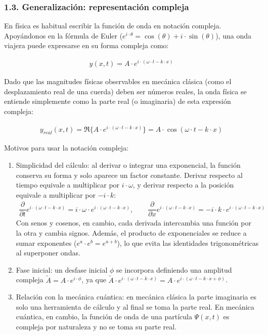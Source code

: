 \documentclass[
  spanish,
]{article}
\providecommand{\tightlist}{%
  \setlength{\itemsep}{0pt}\setlength{\parskip}{0pt}}
\begin{document}
\subsubsection{1.3. Generalización: representación
compleja}\label{generalizaciuxf3n-representaciuxf3n-compleja}

En física es habitual escribir la función de onda en notación compleja.
Apoyándonos en la fórmula de Euler
(\(e^{i \cdot \theta} = \cos(\theta) + i \cdot \sin(\theta)\)), una onda
viajera puede expresarse en su forma compleja como:

\[
\begin{aligned}
y(x,t) = A \cdot e^{i \cdot (\omega \cdot t - k \cdot x)}
\end{aligned}
\]

Dado que las magnitudes físicas observables en mecánica clásica (como el
desplazamiento real de una cuerda) deben ser números reales, la onda
física se entiende simplemente como la parte real (o imaginaria) de esta
expresión compleja:

\[
\begin{aligned}
y_{real}(x,t) = \Re\{A \cdot e^{i \cdot (\omega \cdot t - k \cdot x)}\} = A \cdot \cos(\omega \cdot t - k \cdot x)
\end{aligned}
\]

Motivos para usar la notación compleja:

\begin{enumerate}
\def\labelenumi{\arabic{enumi}.}
\tightlist
\item
  Simplicidad del cálculo: al derivar o integrar una exponencial, la
  función conserva su forma y solo aparece un factor constante. Derivar
  respecto al tiempo equivale a multiplicar por \(i \cdot \omega\), y
  derivar respecto a la posición equivale a multiplicar por
  \(-i \cdot k\): \[
  \begin{aligned}
  \dfrac{\partial}{\partial t} e^{i \cdot (\omega \cdot t - k \cdot x)} = i \cdot \omega \cdot e^{i \cdot (\omega \cdot t - k \cdot x)}, \qquad
  \dfrac{\partial}{\partial x} e^{i \cdot (\omega \cdot t - k \cdot x)} = -i \cdot k \cdot e^{i \cdot (\omega \cdot t - k \cdot x)}
  \end{aligned}
  \] Con senos y cosenos, en cambio, cada derivada intercambia una
  función por la otra y cambia signos. Además, el producto de
  exponenciales se reduce a sumar exponentes
  (\(e^{a} \cdot e^{b} = e^{a+b}\)), lo que evita las identidades
  trigonométricas al superponer ondas.
\item
  Fase inicial: un desfase inicial \(\phi\) se incorpora definiendo una
  amplitud compleja \(\tilde{A} = A \cdot e^{i \cdot \phi}\), ya que
  \(\tilde{A} \cdot e^{i \cdot (\omega \cdot t - k \cdot x)} = A \cdot e^{i \cdot (\omega \cdot t - k \cdot x + \phi)}\).
\item
  Relación con la mecánica cuántica: en mecánica clásica la parte
  imaginaria es solo una herramienta de cálculo y al final se toma la
  parte real. En mecánica cuántica, en cambio, la función de onda de una
  partícula \(\Psi(x,t)\) es compleja por naturaleza y no se toma su
  parte real.
\end{enumerate}
\end{document}
